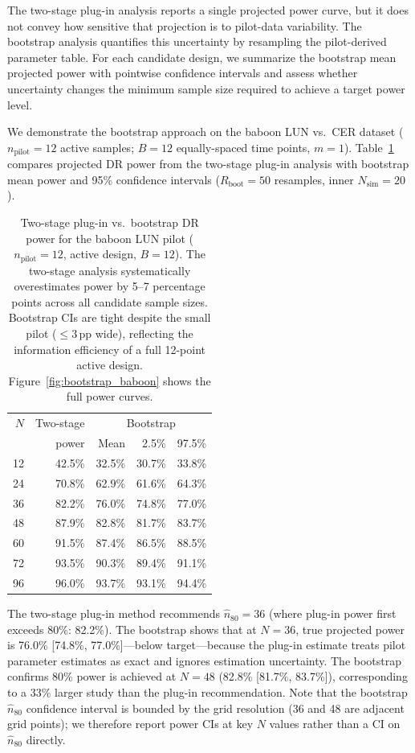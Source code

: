 \documentclass{article}
\begin{document}
The two-stage plug-in analysis reports a single projected power curve, but it does not convey how sensitive that projection is to pilot-data variability. The bootstrap analysis quantifies this uncertainty by resampling the pilot-derived parameter table. For each candidate design, we summarize the bootstrap mean projected power with pointwise confidence intervals and assess whether uncertainty changes the minimum sample size required to achieve a target power level.

We demonstrate the bootstrap approach on the baboon LUN vs.\ CER dataset
($n_{\text{pilot}} = 12$ active samples; $B = 12$ equally-spaced time points,
$m = 1$). Table~\ref{tab:bootstrap_baboon} compares projected DR power from
the two-stage plug-in analysis with bootstrap mean power and 95\% confidence
intervals ($R_{\text{boot}} = 50$ resamples, inner $N_{\text{sim}} = 20$).

\begin{table}[H]
\centering
\small
\begin{tabular}{r|r|rrr}
\toprule
$N$ & Two-stage & \multicolumn{3}{c}{Bootstrap} \\
 & power & Mean & 2.5\% & 97.5\% \\
\midrule
12 & 42.5\% & 32.5\% & 30.7\% & 33.8\% \\
24 & 70.8\% & 62.9\% & 61.6\% & 64.3\% \\
36 & 82.2\% & 76.0\% & 74.8\% & 77.0\% \\
48 & 87.9\% & 82.8\% & 81.7\% & 83.7\% \\
60 & 91.5\% & 87.4\% & 86.5\% & 88.5\% \\
72 & 93.5\% & 90.3\% & 89.4\% & 91.1\% \\
96 & 96.0\% & 93.7\% & 93.1\% & 94.4\% \\
\bottomrule
\end{tabular}
\caption{Two-stage plug-in vs.\ bootstrap DR power for the baboon LUN pilot
($n_{\text{pilot}} = 12$, active design, $B = 12$). The two-stage analysis
systematically overestimates power by 5--7 percentage points across all
candidate sample sizes. Bootstrap CIs are tight despite the small pilot
($\leq 3$\,pp wide), reflecting the information efficiency of a full 12-point
active design. Figure~\ref{fig:bootstrap_baboon} shows the full power curves.}
\label{tab:bootstrap_baboon}
\end{table}

The two-stage plug-in method recommends $\hat{n}_{80} = 36$ (where plug-in
power first exceeds 80\%: 82.2\%). The bootstrap shows that at $N = 36$,
true projected power is 76.0\% [74.8\%, 77.0\%]---below target---because the
plug-in estimate treats pilot parameter estimates as exact and ignores
estimation uncertainty. The bootstrap confirms 80\% power is achieved at
$N = 48$ (82.8\% [81.7\%, 83.7\%]), corresponding to a 33\% larger study than
the plug-in recommendation. Note that the bootstrap $\hat{n}_{80}$ confidence
interval is bounded by the grid resolution (36 and 48 are adjacent grid
points); we therefore report power CIs at key $N$ values rather than a CI on
$\hat{n}_{80}$ directly.
\end{document}

